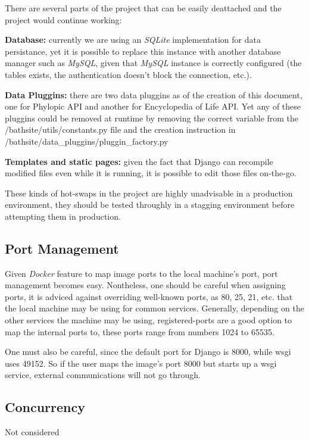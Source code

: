 \documentclass[10pt]{article}
\begin{document}
There are several parts of the project that can be easily deattached and the project would continue working:

\textbf{Database:} currently we are using an \textit{SQLite} implementation for data persistance, yet it is possible to replace this instance with another database manager such as \textit{MySQL}, given that \textit{MySQL} instance is correctly configured (the tables exists, the authentication doesn't block the connection, etc.).

\textbf{Data Pluggins:} there are two data pluggins as of the creation of this document, one for Phylopic API and another for Encyclopedia of Life API. Yet any of these pluggins could be removed at runtime by removing the correct variable from the /bathsite/utils/constants.py file and the creation instruction in /bathsite/data_pluggins/pluggin_factory.py 

\textbf{Templates and static pages:} given the fact that Django can recompile modified files even while it is running,  it is possible to edit those files on-the-go.
 
 These kinds of hot-swaps in the project are highly unadvisable in a production environment, they should be tested throughly in a stagging environment before attempting them in production.
 
 \subsection{Port Management}
 
Given \textit{Docker} feature to map image ports to the local machine's port, port management becomes easy. Nontheless, one should be careful when assigning ports, it is adviced against overriding well-known ports, as 80, 25, 21, etc. that the local machine may be using for common services. Generally, depending on the other services the machine may be using, registered-ports are a good option to map the internal ports to, these ports range from numbers 1024 to 65535. 

One must also be careful, since the default port for Django is 8000, while wsgi uses 49152. So if the user maps the image's port 8000 but starts up a wsgi service, external communications will not go through.
 
 \subsection{Concurrency}
 
 Not considered
 
\end{document}
